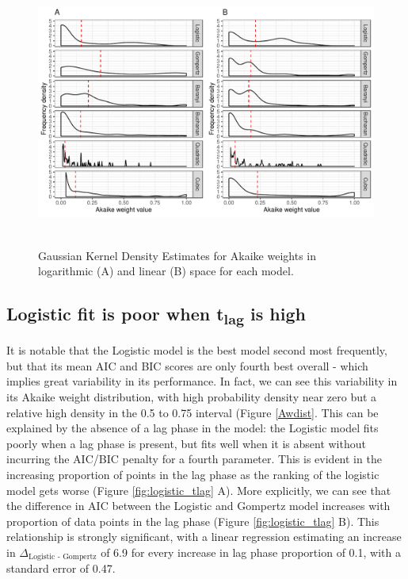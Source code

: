 \documentclass[11pt, a4paper]{article}
\begin{document}
\begin{linenumbers}
        \begin{figure}[H]
        \includegraphics[height=3.5in]{../results/Aw_distributions.pdf}
        \caption{Gaussian Kernel Density Estimates for Akaike weights in logarithmic (A) and linear (B) space for each model.}
        \label{fig:AWdist}
        \end{figure}
        
        

        
        \subsection{Logistic fit is poor when t\textsubscript{lag} is high}
                
        It is notable that the Logistic model is the best model second most frequently, but that its mean AIC and BIC scores are only fourth best overall - which implies great variability in its performance. In fact, we can see this variability in its Akaike weight distribution, with high probability density near zero but a relative high density in the 0.5 to 0.75 interval (Figure \ref{Awdist}.  This can be explained by the absence of a lag phase in the model: the Logistic model fits poorly when a lag phase is present, but fits well when it is absent without incurring the AIC/BIC penalty for a fourth parameter. This is evident in the increasing proportion of points in the lag phase as the ranking of the logistic model gets worse (Figure \ref{fig:logistic_tlag} A). More explicitly, we can see that the difference in AIC between the Logistic and Gompertz model increases with proportion of data points in the lag phase (Figure \ref{fig:logistic_tlag} B). This relationship is strongly significant, with a linear regression estimating an increase in $\Delta_{\text{Logistic - Gompertz}}$ of 6.9 for every increase in lag phase proportion of 0.1, with a standard error of 0.47.
        

\end{linenumbers}
\end{document}
